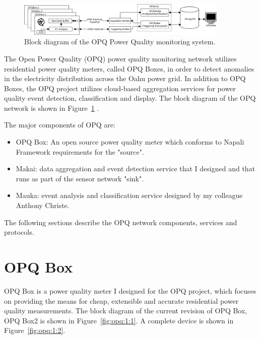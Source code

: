 \begin{figure}[h]
  \begin{center}
  \includegraphics[width=0.9\textwidth]{img/system-diagram.png}
  \end{center}
  \caption{Block diagram of the OPQ Power Quality monitoring system.}
  \label{fig:opq:1}
\end{figure}

The Open Power Quality (OPQ) power quality monitoring network utilizes residential power quality meters, called OPQ Boxes, in order to detect anomalies in the electricity distribution across the Oahu power grid.
In addition to OPQ Boxes, the OPQ project utilizes cloud-based aggregation services for power quality event detection, classification and display.
The block diagram of the OPQ network is shown in Figure~\ref{fig:opq:1} .

The major components of OPQ are:
\begin {itemize}
	\item OPQ Box: An open source power quality meter which conforms to Napali Framework requirements for the "source".
	\item Makai: data aggregation and event detection service that I designed and that runs as part of the sensor network "sink".
	\item Mauka: event analysis and classification service designed by my colleague Anthony Christe.
\end {itemize}

The following sections describe the OPQ network components, services and protocols.

\section{OPQ Box}\label{sec:opq-box}

OPQ Box is a power quality meter I designed for the OPQ project, which focuses on providing the means for cheap, extensible and accurate residential power quality measurements.
The block diagram of the current revision of OPQ Box, OPQ Box2 is shown in Figure~\ref{fig:opq:1:1}.
A complete device is shown in Figure~\ref{fig:opq:1:2}.

